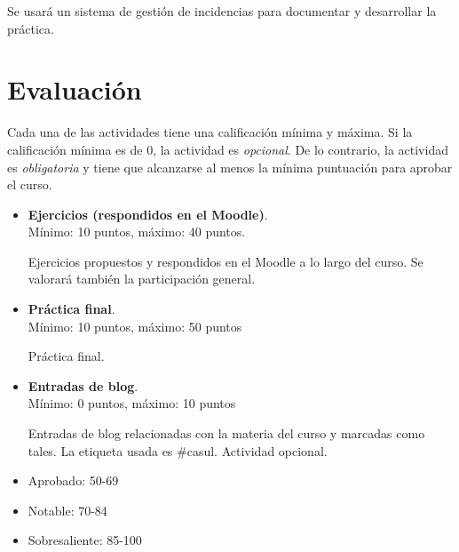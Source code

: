 \documentclass[a4paper]{article}
\begin{document}
      Se usará un sistema de gestión de incidencias para documentar y desarrollar la práctica.
      

  \section{Evaluación}
  Cada una de las actividades tiene una calificación mínima y máxima. Si la calificación mínima es de 0, la actividad es \textit{opcional}. De lo contrario, la actividad es 
\textit{obligatoria} y tiene que alcanzarse al menos la mínima puntuación para aprobar el curso.

  \begin{itemize}
    \item \textbf{Ejercicios (respondidos en el Moodle)}. \\
    Mínimo: 10 puntos, máximo: 40 puntos.

    Ejercicios propuestos y respondidos en el Moodle a lo largo del curso. Se valorará también la participación general.
    \item \textbf{Práctica final}. \\
    Mínimo: 10 puntos, máximo: 50 puntos

    Práctica final. 
    \item \textbf{Entradas de blog}. \\
    Mínimo: 0 puntos, máximo: 10 puntos

    Entradas de blog relacionadas con la materia del curso y marcadas como tales. La etiqueta usada es \#casul. Actividad opcional. 
  \end{itemize} 

  \begin{itemize}
    \item Aprobado: 50-69
    \item Notable: 70-84
    \item Sobresaliente: 85-100
  \end{itemize}

\end{document}
